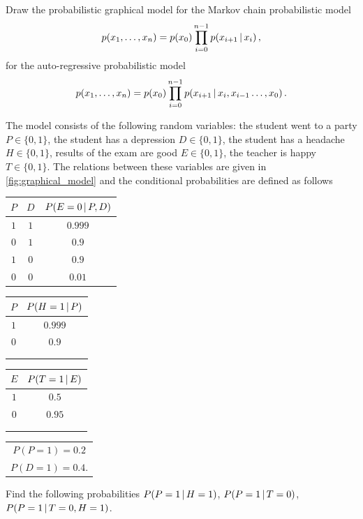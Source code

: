 \begin{exercise}
    Draw the probabilistic graphical model for the Markov chain probabilistic model
    \begin{align}
        p(x_1,\ldots,x_n) = p(x_0)\prod_{i=0}^{n-1}p(x_{i+1}\,|\, x_i)\,,
    \end{align}
    for the auto-regressive probabilistic model
    \begin{align}
        p(x_1,\ldots,x_n) = p(x_0)\prod_{i=0}^{n-1}p(x_{i+1}\,|\, x_i,x_{i-1}\ldots, x_0)\,.
    \end{align}
\end{exercise}

\begin{exercise}
\label{exs:graph_model}
    The model consists of the following random variables: the student went to a party $P \in \{0,1\}$, the student has a depression $D \in \{0,1\}$, the student has a headache $H \in \{0,1\}$, results of the exam are good $E \in \{0,1\}$, the teacher is happy $T \in \{0,1\}$. The relations between these variables are given in \cref{fig:graphical_model} and the conditional probabilities are defined as follows
    \begin{center}
    \begin{tabular}{cc|c}
        $P$ & $D$ & $P(E = 0\,|\, P,D)$  \\
        \midrule
        $1$ & $1$ & $0.999$ \\
        $0$ & $1$ & $0.9$ \\
        $1$ & $0$ & $0.9$ \\
        $0$ & $0$ & $0.01$
    \end{tabular}
    \begin{tabular}{c|c}
        $P$ & $P(H = 1\,|\, P)$  \\
        \midrule
        $1$ & $0.999$ \\
        $0$ & $0.9$ \\
        & \\
        & \\
    \end{tabular}
    \begin{tabular}{c|c}
        $E$ & $P(T = 1\,|\, E)$  \\
        \midrule
        $1$ & $0.5$ \\
        $0$ & $0.95$ \\
        & \\
        & \\
    \end{tabular}
    \begin{tabular}{c}
        $P(P = 1) = 0.2$\\
        $P(D = 1) = 0.4$.
    \end{tabular}
    \end{center}
    Find the following probabilities $P(P=1\,|\, H=1)$, $P(P=1\,|\, T=0)$, $P(P=1\,|\, T=0, H=1)$.
\end{exercise}

